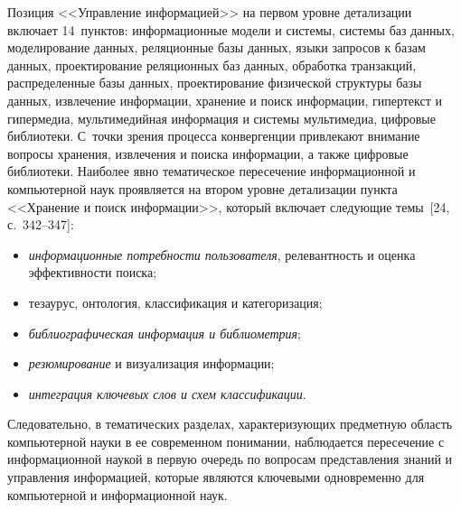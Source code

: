 \begin{multicols}{2}
      Позиция <<Управление информацией>> на первом уровне детализации включает
14~пунктов: информационные модели и системы, системы баз данных, моделирование данных,
реляционные базы данных, языки запросов к базам данных, про\-ек\-тиро\-ва\-ние реляционных баз
данных, обработка
 транз\-ак\-ций, распределенные базы данных, проектирование физической
структуры базы данных, извлечение информации, хранение и поиск информации, гипертекст и
гипермедиа, муль\-ти\-ме\-дий\-ная информация и системы мультимедиа, цифровые библиотеки. 
С~точки зрения процесса
 конвергенции привлекают внимание вопросы хранения, извлечения и
поиска информации, а также цифровые библиотеки. Наиболее явно тематическое пересечение
информационной и компьютерной наук проявляется на втором уровне детализации пункта
<<Хранение и поиск информации>>, который включает сле\-ду\-ющие темы~[24,
с.~342--347]:
      \begin{itemize}
\item \textit{информационные потребности пользователя}, релевантность и оценка
эффективности поиска;
\item тезаурус, онтология, классификация и категоризация;
\item \textit{библиографическая информация и библиометрия};
\item \textit{резюмирование} и визуализация информации;
\item \textit{интеграция ключевых слов и схем классификации}.
\end{itemize}

      Следовательно, в тематических разделах, характеризующих предметную область
компьютерной науки в ее современном понимании, наблюдается пересечение с
информационной наукой в первую очередь по вопросам представления знаний и управления
информацией, которые являются ключевыми одновременно для компьютерной и
информационной наук.

  \end{multicols}

\begin{figure*} %
\vspace*{1pt}
\begin{center}
\mbox{%
\epsfxsize=158mm
}
\end{center}
\vspace*{-9pt}
\end{figure*}

